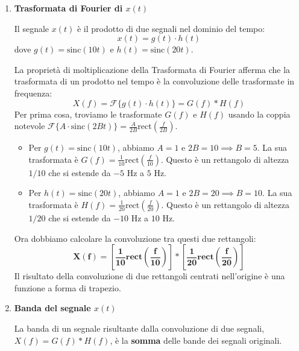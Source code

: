 
\begin{soluzione}{18}
    \begin{enumerate}
        \item \textbf{Trasformata di Fourier di $x(t)$}
        
        Il segnale $x(t)$ è il prodotto di due segnali nel dominio del tempo:
        \[
            x(t) = g(t) \cdot h(t)
        \]
        dove $g(t) = \text{sinc}(10t)$ e $h(t) = \text{sinc}(20t)$.
        
        La proprietà di moltiplicazione della Trasformata di Fourier afferma che la trasformata di un prodotto nel tempo è la convoluzione delle trasformate in frequenza:
        \[
            X(f) = \mathcal{F}\{g(t) \cdot h(t)\} = G(f) * H(f)
        \]
        Per prima cosa, troviamo le trasformate $G(f)$ e $H(f)$ usando la coppia notevole $\mathcal{F}\{A \cdot \text{sinc}(2Bt)\} = \frac{A}{2B} \text{rect}(\frac{f}{2B})$.
        \begin{itemize}
            \item Per $g(t) = \text{sinc}(10t)$, abbiamo $A=1$ e $2B=10 \implies B=5$.
            La sua trasformata è $G(f) = \frac{1}{10} \text{rect}\left(\frac{f}{10}\right)$. Questo è un rettangolo di altezza $1/10$ che si estende da $-5$ Hz a $5$ Hz.
            
            \item Per $h(t) = \text{sinc}(20t)$, abbiamo $A=1$ e $2B=20 \implies B=10$.
            La sua trasformata è $H(f) = \frac{1}{20} \text{rect}\left(\frac{f}{20}\right)$. Questo è un rettangolo di altezza $1/20$ che si estende da $-10$ Hz a $10$ Hz.
        \end{itemize}
        
        Ora dobbiamo calcolare la convoluzione tra questi due rettangoli:
        \[
            \mathbf{X(f) = \left[ \frac{1}{10} \text{rect}\left(\frac{f}{10}\right) \right] * \left[ \frac{1}{20} \text{rect}\left(\frac{f}{20}\right) \right]}
        \]
        Il risultato della convoluzione di due rettangoli centrati nell'origine è una funzione a forma di trapezio.
        
        \item \textbf{Banda del segnale $x(t)$}
        
        La banda di un segnale risultante dalla convoluzione di due segnali, $X(f) = G(f) * H(f)$, è la \textbf{somma} delle bande dei segnali originali.
        

\end{enumerate}
\end{soluzione}

